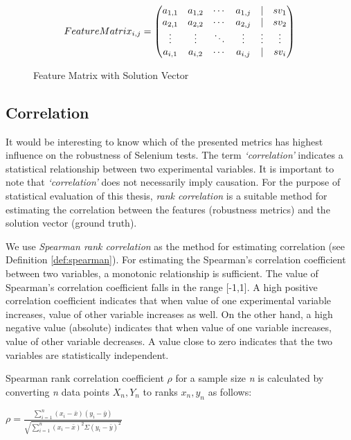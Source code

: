 \begin{figure}[ht]
\[
Feature\smallskip Matrix_{i,j} = 
\begin{pmatrix}
  a_{1,1} & a_{1,2} & \cdots & a_{1,j} & | & \textit{$sv_{1}$}\\
  a_{2,1} & a_{2,2} & \cdots & a_{2,j} & | & \textit{$sv_{2}$}\\
  \vdots  & \vdots  & \ddots & \vdots  & \vdots & \vdots \\
  a_{i,1} & a_{i,2} & \cdots & a_{i,j} & | & \textit{$sv_{i}$}
\end{pmatrix}
\]
\caption{Feature Matrix with Solution Vector}
\label{fig:featurematrix}
\end{figure}

\subsection*{Correlation}
It would be interesting to know which of the presented metrics has highest influence on the robustness of Selenium tests. The term \textit{`correlation'} indicates a statistical relationship between two experimental variables. It is important to note that \textit{`correlation'} does not necessarily imply causation. For the  purpose of statistical evaluation of this thesis, \textit{rank correlation} is a suitable method for estimating the correlation between the features (robustness metrics) and the solution vector (ground truth).

We use \textit{Spearman rank correlation} as the method for estimating correlation (see Definition \ref{def:spearman}). For estimating the Spearman's correlation coefficient between two variables, a monotonic relationship is sufficient. The value of Spearman's correlation coefficient falls in the range [-1,1]. A high positive correlation coefficient indicates that when value of one experimental variable increases, value of other variable increases as well. On the other hand, a high negative value (absolute) indicates that when value of one variable increases, value of other variable decreases. A value close to zero indicates that the two variables are statistically independent. 
\theoremstyle{definition}
\begin{definition}{Spearman rank correlation coefficient $\rho$ for a sample size \textit{n} is calculated by converting \textit{n} data points \textit{$X_n,Y_n$} to ranks \textit{$x_n,y_n$} as follows:}

\begin{center}\Large
$\rho = \frac{\sum\limits_{i=1}^{n}(x_i - \bar{x})(y_i - \bar{y})}{\sqrt{\sum\limits_{i=1}^{n}(x_i - \bar{x})^2\Sigma(y_i - \bar{y})^2}}$
\end{center}
\label{def:spearman}
\end{definition}

